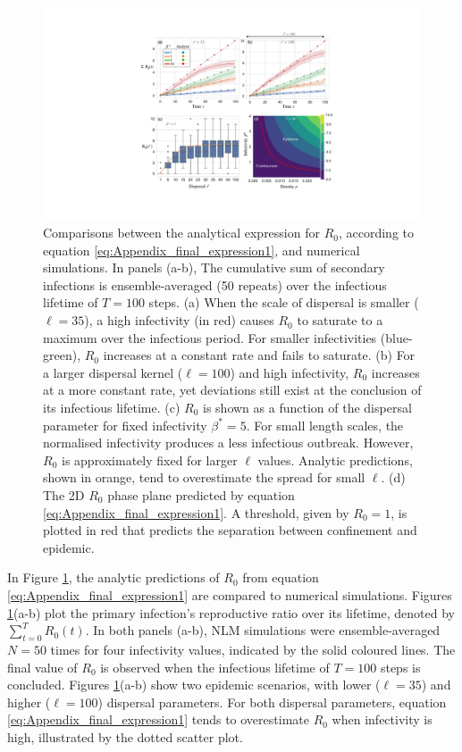 \begin{figure}
    \centering
    \includegraphics[scale=0.475]{chapter5/figures/fig3b-R0-analytic.pdf}
    \caption{Comparisons between the analytical expression for $R_0$, according to equation \ref{eq:Appendix_final_expression1}, and numerical simulations.
    In panels (a-b), The cumulative sum of secondary infections is ensemble-averaged (50 repeats) over the infectious lifetime of $T=100$ steps.
    (a) When the scale of dispersal is smaller ($\ell=35$), a high infectivity (in red) causes $R_0$ to saturate to a maximum over the infectious period.
    For smaller infectivities (blue-green), $R_0$ increases at a constant rate and fails to saturate.
    (b) For a larger dispersal kernel ($\ell=100$) and high infectivity, $R_0$ increases at a more constant rate, 
    yet deviations still exist at the conclusion of its infectious lifetime.
    (c) $R_0$ is shown as a function of the dispersal parameter for fixed infectivity $\beta^*=5$. For small length scales, the normalised infectivity produces a less infectious outbreak. However, $R_0$ is approximately fixed for larger $\ell$ values. Analytic predictions, shown in orange, tend to overestimate the spread for small $\ell$.
    (d) The 2D $R_0$ phase plane predicted by equation \ref{eq:Appendix_final_expression1}. A threshold, given by $R_0=1$, is plotted in red that predicts the separation between confinement and epidemic.}
    \label{fig:R0-analytic-vs-sims}
\end{figure}

In Figure \ref{fig:R0-analytic-vs-sims}, the analytic predictions of $R_0$ from equation \ref{eq:Appendix_final_expression1} are compared to numerical simulations. 
Figures \ref{fig:R0-analytic-vs-sims}(a-b) plot the primary infection's reproductive ratio over its lifetime, denoted by $\sum_{t=0}^T R_0(t)$.
In both panels (a-b), NLM simulations were ensemble-averaged $N=50$ times for four infectivity values, indicated by the solid coloured lines. 
The final value of $R_0$ is observed when the infectious lifetime of $T=100$ steps is concluded.
Figures \ref{fig:R0-analytic-vs-sims}(a-b) show two epidemic scenarios, with lower ($\ell=35$) and higher ($\ell=100$) dispersal parameters.
For both dispersal parameters, equation \ref{eq:Appendix_final_expression1} tends to overestimate $R_0$ when infectivity is high, illustrated by the dotted scatter plot.

